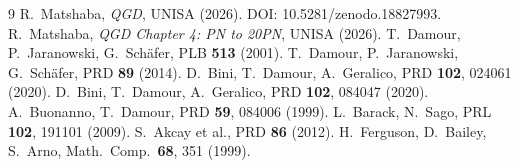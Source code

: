 \documentclass[11pt,a4paper]{article}
\theoremstyle{plain}
\theoremstyle{definition}
\theoremstyle{remark}
\begin{document}
\begin{thebibliography}{9}
R.~Matshaba, \textit{QGD}, UNISA (2026). DOI: 10.5281/zenodo.18827993.
R.~Matshaba, \textit{QGD Chapter 4: PN to 20PN}, UNISA (2026).
T.~Damour, P.~Jaranowski, G.~Sch\"afer, PLB \textbf{513} (2001).
T.~Damour, P.~Jaranowski, G.~Sch\"afer, PRD \textbf{89} (2014).
D.~Bini, T.~Damour, A.~Geralico, PRD \textbf{102}, 024061 (2020).
D.~Bini, T.~Damour, A.~Geralico, PRD \textbf{102}, 084047 (2020).
A.~Buonanno, T.~Damour, PRD \textbf{59}, 084006 (1999).
L.~Barack, N.~Sago, PRL \textbf{102}, 191101 (2009).
S.~Akcay et al., PRD \textbf{86} (2012).
H.~Ferguson, D.~Bailey, S.~Arno, Math.\ Comp.\ \textbf{68}, 351 (1999).
\end{thebibliography}
\end{document}

